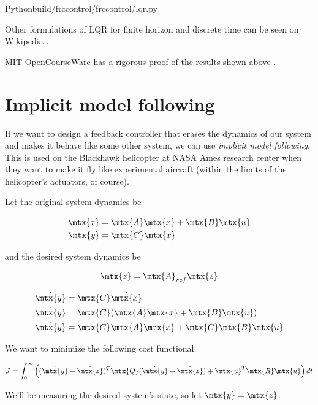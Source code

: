 \begin{code}{Python}{build/frccontrol/frccontrol/lqr.py}
  \caption{Infinite horizon, discrete time LQR computation in Python}
  \label{lst:lqr}
\end{code}

Other formulations of LQR for finite horizon and discrete time can be seen on
Wikipedia \cite{bib:wiki_lqr}.

MIT OpenCourseWare has a rigorous proof of the results shown above
\cite{bib:lqr_derivs}.

\section{Implicit model following}

If we want to design a feedback controller that erases the dynamics of our
system and makes it behave like some other system, we can use \textit{implicit
model following}. This is used on the Blackhawk helicopter at NASA Ames research
center when they want to make it fly like experimental aircraft (within the
limits of the helicopter's actuators, of course).

Let the original system dynamics be

\begin{align*}
  \dot{\mtx{x}} &= \mtx{A}\mtx{x} + \mtx{B}\mtx{u} \\
  \mtx{y} &= \mtx{C}\mtx{x}
\end{align*}

and the desired system dynamics be

\begin{equation*}
  \dot{\mtx{z}} = \mtx{A}_{ref}\mtx{z}
\end{equation*}

\begin{align*}
  \dot{\mtx{y}} &= \mtx{C}\dot{\mtx{x}} \\
  \dot{\mtx{y}} &= \mtx{C}(\mtx{A}\mtx{x} + \mtx{B}\mtx{u}) \\
  \dot{\mtx{y}} &= \mtx{C}\mtx{A}\mtx{x} + \mtx{C}\mtx{B}\mtx{u}
\end{align*}

We want to minimize the following cost functional.

\begin{equation*}
  J = \int_0^\infty \left((\dot{\mtx{y}} - \dot{\mtx{z}})^T \mtx{Q} (\dot{\mtx{y}} - \dot{\mtx{z}}) + \mtx{u}^T\mtx{R}\mtx{u}\right) dt
\end{equation*}

We'll be measuring the desired system's state, so let $\mtx{y} = \mtx{z}$.


